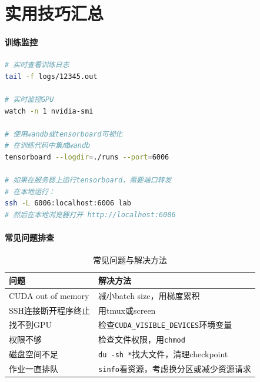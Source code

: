 \section*{实用技巧汇总}

\paragraph{训练监控}\mbox{}\par\nopagebreak

\begin{lstlisting}[language=bash, caption=监控训练过程]
# 实时查看训练日志
tail -f logs/12345.out

# 实时监控GPU
watch -n 1 nvidia-smi

# 使用wandb或tensorboard可视化
# 在训练代码中集成wandb
tensorboard --logdir=./runs --port=6006

# 如果在服务器上运行tensorboard，需要端口转发
# 在本地运行：
ssh -L 6006:localhost:6006 lab
# 然后在本地浏览器打开 http://localhost:6006
\end{lstlisting}

\paragraph{常见问题排查}\mbox{}\par\nopagebreak

\begin{table}[H]
\centering
\small
\renewcommand{\arraystretch}{1.4}
\begin{tabular}{l|l}
\toprule
\textbf{问题} & \textbf{解决方法} \\
\midrule
CUDA out of memory & 减小batch size，用梯度累积 \\
SSH连接断开程序终止 & 用tmux或screen \\
找不到GPU & 检查\texttt{CUDA\_VISIBLE\_DEVICES}环境变量 \\
权限不够 & 检查文件权限，用\texttt{chmod} \\
磁盘空间不足 & \texttt{du -sh *}找大文件，清理checkpoint \\
作业一直排队 & \texttt{sinfo}看资源，考虑换分区或减少资源请求 \\
\bottomrule
\end{tabular}
\caption{常见问题与解决方法}
\end{table}

